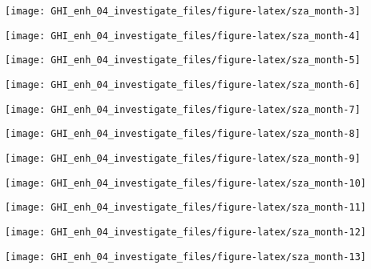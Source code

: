 \documentclass[
  10pt,
  a4paper,oneside]{article}
\begin{document}
\begin{center}\texttt{[image: GHI\_enh\_04\_investigate\_files/figure-latex/sza\_month-3]} \end{center}

\begin{center}\texttt{[image: GHI\_enh\_04\_investigate\_files/figure-latex/sza\_month-4]} \end{center}

\begin{center}\texttt{[image: GHI\_enh\_04\_investigate\_files/figure-latex/sza\_month-5]} \end{center}

\begin{center}\texttt{[image: GHI\_enh\_04\_investigate\_files/figure-latex/sza\_month-6]} \end{center}

\begin{center}\texttt{[image: GHI\_enh\_04\_investigate\_files/figure-latex/sza\_month-7]} \end{center}

\begin{center}\texttt{[image: GHI\_enh\_04\_investigate\_files/figure-latex/sza\_month-8]} \end{center}

\begin{center}\texttt{[image: GHI\_enh\_04\_investigate\_files/figure-latex/sza\_month-9]} \end{center}

\begin{center}\texttt{[image: GHI\_enh\_04\_investigate\_files/figure-latex/sza\_month-10]} \end{center}

\begin{center}\texttt{[image: GHI\_enh\_04\_investigate\_files/figure-latex/sza\_month-11]} \end{center}

\begin{center}\texttt{[image: GHI\_enh\_04\_investigate\_files/figure-latex/sza\_month-12]} \end{center}

\begin{center}\texttt{[image: GHI\_enh\_04\_investigate\_files/figure-latex/sza\_month-13]} \end{center}
\end{document}
